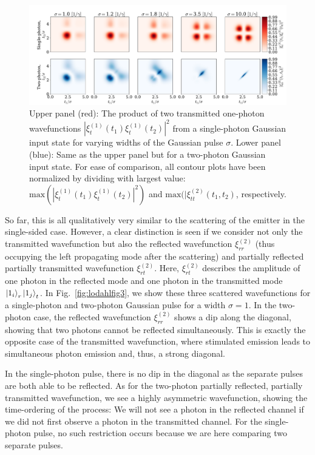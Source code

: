 \begin{figure}[H]
    \centering
    \includegraphics[width=\linewidth]{figures/lodahl_fig2.pdf}
    \caption{Upper panel (red): The product of two transmitted one-photon wavefunctions $|\xi_t^{(1)}(t_1)\xi_t^{(1)}(t_2)|^2$ from a single-photon Gaussian input state for varying widths of the Gaussian pulse $\sigma$. Lower panel (blue): Same as the upper panel but for a two-photon Gaussian input state. For ease of comparison, all contour plots have been normalized by dividing with largest value: $\mathrm{max}(|\xi_t^{(1)}(t_1)\xi_t^{(1)}(t_2)|^2)$ and $\mathrm{max}(|\xi_{tt}^{(2)}(t_1,t_2)$, respectively. \label{fig:lodahlfig2}}
\end{figure}

So far, this is all qualitatively very similar to the scattering of the emitter in the single-sided case. However, a clear distinction is seen if we consider not only the transmitted wavefunction but also the reflected wavefunction $\xi^{(2)}_{rr}$ (thus occupying the left propagating mode after the scattering) and partially reflected partially transmitted wavefunction $\xi^{(2)}_{rt}$. Here, $\xi^{(2)}_{rt}$ describes the amplitude of one photon in the reflected mode and one photon in the transmitted mode $\ket{1_i}_r\ket{1_j}_t$. In Fig.~\ref{fig:lodahlfig3}, we show these three scattered wavefunctions for a single-photon and two-photon Gaussian pulse for a width $\sigma = 1$. In the two-photon case, the reflected wavefunction $\xi^{(2)}_{rr}$ shows a dip along the diagonal, showing that two photons cannot be reflected simultaneously. This is exactly the opposite case of the transmitted wavefunction, where stimulated emission leads to simultaneous photon emission and, thus, a strong diagonal.

In the single-photon pulse, there is no dip in the diagonal as the separate pulses are both able to be reflected. As for the two-photon partially reflected, partially transmitted wavefunction, we see a highly asymmetric wavefunction, showing the time-ordering of the process: We will not see a photon in the reflected channel if we did not first observe a photon in the transmitted channel. For the single-photon pulse, no such restriction occurs because we are here comparing two separate pulses.





